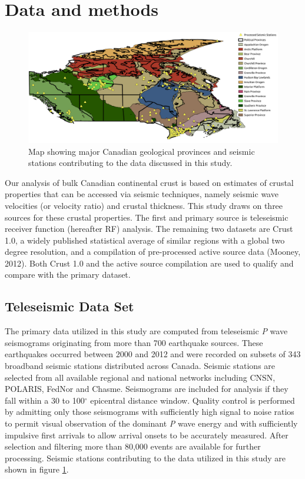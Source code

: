 \documentclass[review]{elsarticle}
\begin{document}


\section{Data and methods}


\begin{figure}
  \centering
  \includegraphics[width=\textwidth]{stationMap.pdf}
  \caption{Map showing major Canadian geological provinces and seismic stations contributing to the data discussed in this study.}
  \label{map:stationMap}
\end{figure}


Our analysis of bulk Canadian continental crust is based on estimates of crustal properties that can be accessed via seismic techniques, namely seismic wave velocities (or velocity ratio) and crustal thickness. This study draws on three sources for these crustal properties. The first and primary source is teleseismic receiver function (hereafter RF) analysis. The remaining two datasets are Crust 1.0, a widely published statistical average of similar regions with a global two degree resolution, and a compilation of pre-processed active source data (Mooney, 2012). Both Crust 1.0 and the active source compilation are used to qualify and compare with the primary dataset.




\subsection{Teleseismic Data Set}
The primary data utilized in this study are computed from teleseismic {\it P} wave seismograms originating from more than 700 earthquake sources. These earthquakes occurred between 2000 and 2012 and were recorded on subsets of 343 broadband seismic stations distributed across Canada. Seismic stations are selected from all available regional and national networks including CNSN, POLARIS, FedNor and Chasme. Seismograms are included for analysis if they fall within a 30 to 100$^\circ$ epicentral distance window. Quality control is performed by admitting only those seismograms with sufficiently high signal to noise ratios to permit visual observation of the dominant {\it P} wave energy and with sufficiently impulsive first arrivals to allow arrival onsets to be accurately measured. After selection and filtering more than 80,000 events are available for further processing. Seismic stations contributing to the data utilized in this study are shown in figure \ref{map:stationMap}.
\end{document}
